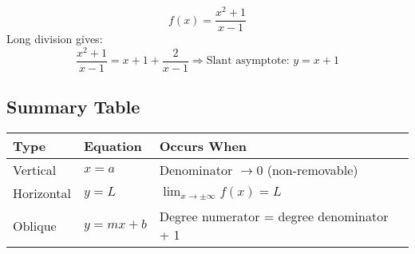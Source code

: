 \[
f(x) = \frac{x^2 + 1}{x - 1}
\]
Long division gives:
\[
\frac{x^2 + 1}{x - 1} = x + 1 + \frac{2}{x - 1}
\Rightarrow \text{Slant asymptote: } y = x + 1
\]

\subsection{Summary Table}

\begin{center}
\begin{tabular}{|l|l|l|}
\hline
\textbf{Type} & \textbf{Equation} & \textbf{Occurs When} \\
\hline
Vertical      & \(x = a\)           & Denominator \(\to 0\) (non-removable) \\
Horizontal    & \(y = L\)           & \(\lim_{x \to \pm \infty} f(x) = L\) \\
Oblique       & \(y = mx + b\)      & Degree numerator = degree denominator + 1 \\
\hline
\end{tabular}
\end{center}